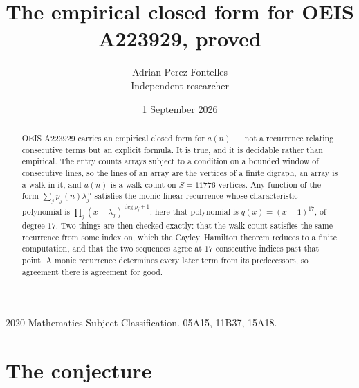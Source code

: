 \documentclass[11pt,a4paper]{article}
\title{The empirical closed form for OEIS A223929, proved}
\author{Adrian Perez Fontelles\\ \small Independent researcher}
\date{1 September 2026}
\theoremstyle{plain}
\theoremstyle{definition}
\begin{document}
\maketitle

\begin{abstract}
OEIS A223929 carries an empirical closed form for $a(n)$ --- not a recurrence relating
consecutive terms but an explicit formula. It is true, and it is decidable rather than
empirical. The entry counts arrays subject to a condition on a bounded window of consecutive lines, so the lines of an array are the
vertices of a finite digraph, an array is a walk in it, and $a(n)$ is a walk count on
$S=11776$ vertices. Any function of the form $\sum_j p_j(n)\lambda_j^{\,n}$ satisfies the
monic linear recurrence whose characteristic polynomial is
$\prod_j(x-\lambda_j)^{\deg p_j+1}$; here that polynomial is $q(x)=(x-1)^{17}$, of degree
$17$. Two things are then checked exactly: that the walk count satisfies the same
recurrence from some index on, which the Cayley--Hamilton theorem reduces to a finite
computation, and that the two sequences agree at $17$ consecutive indices past that
point. A monic recurrence determines every later term from its predecessors, so agreement
there is agreement for good.
\end{abstract}

\noindent\small 2020 Mathematics Subject Classification. 05A15, 11B37, 15A18.\normalsize

\section{The conjecture}
\end{document}
